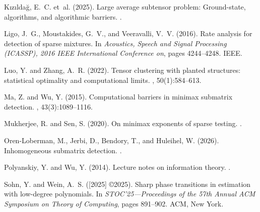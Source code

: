 \documentclass[11pt,reqno,letterpaper]{amsart}
\numberwithin{equation}{section}
\theoremstyle{plain}
\begin{document}
\begin{thebibliography}{}
	K{\i}z{\i}lda{\u{g}}, E.~C. et~al. (2025).
	\newblock Large average subtensor problem: Ground-state, algorithms, and
	algorithmic barriers.
	.
	
	Ligo, J.~G., Moustakides, G.~V., and Veeravalli, V.~V. (2016).
	\newblock Rate analysis for detection of sparse mixtures.
	\newblock In {\em Acoustics, Speech and Signal Processing (ICASSP), 2016 IEEE
		International Conference on}, pages 4244--4248. IEEE.
	
	Luo, Y. and Zhang, A.~R. (2022).
	\newblock Tensor clustering with planted structures: statistical optimality and
	computational limits.
	, 50(1):584--613.
	
	Ma, Z. and Wu, Y. (2015).
	\newblock Computational barriers in minimax submatrix detection.
	, 43(3):1089--1116.
	
	Mukherjee, R. and Sen, S. (2020).
	\newblock On minimax exponents of sparse testing.
	.
	
	Oren-Loberman, M., Jerbi, D., Bendory, T., and Huleihel, W. (2026).
	\newblock Inhomogeneous submatrix detection.
	.
	
	Polyanskiy, Y. and Wu, Y. (2014).
	\newblock Lecture notes on information theory.
	.
	
	Sohn, Y. and Wein, A.~S. ([2025] \copyright 2025).
	\newblock Sharp phase transitions in estimation with low-degree polynomials.
	\newblock In {\em S{TOC}'25---{P}roceedings of the 57th {A}nnual {ACM}
		{S}ymposium on {T}heory of {C}omputing}, pages 891--902. ACM, New York.
	
\end{thebibliography}
\end{document}
